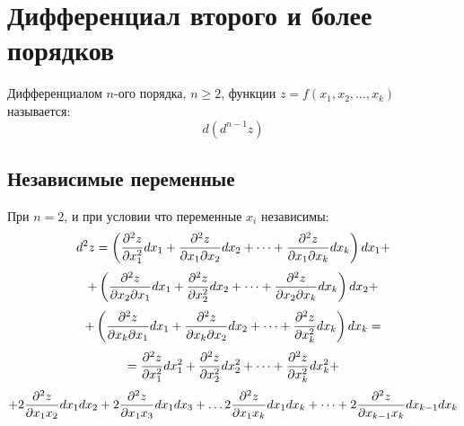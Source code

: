 \section{Дифференциал второго и более порядков}
Дифференциалом $n$-ого порядка, $n \geq 2$, функции $z=f(x_1, x_2, \dots, x_k)$ называется:
$$d(d^{n-1}z)$$
\subsection{Независимые переменные}
При $n = 2$, и при условии что переменные $x_i$ независимы:
$$d^2z = \left(
{\partial^2z \over \partial x_1^2}d x_1 +
{\partial^2z \over \partial x_1\partial x_2}d x_2 +
\dots +
{\partial^2z \over \partial x_1\partial x_k}d x_k  
\right)d x_1 + $$
$$ + \left(
{\partial^2z \over \partial x_2\partial x_1}d x_1 +
{\partial^2z \over \partial x_2^2}d x_2 +
\dots +
{\partial^2z \over \partial x_2\partial x_k}d x_k  
\right)d x_2 + $$
$$ + \left({\partial^2z \over \partial x_k\partial x_1}d x_1 +
{\partial^2z \over \partial x_k\partial x_2}d x_2 +
\dots +
{\partial^2z \over \partial x_k^2}d x_k  
\right)d x_k = $$
$$= {\partial^2z \over \partial x_1^2}d x_1^2 +
{\partial^2z \over \partial x_2^2}d x_2^2 +
\dots  +
{\partial^2z \over \partial x_k^2}d x_k^2 +  $$
$$+ 2 {\partial^2z \over \partial x_1x_2}dx_1dx_2 + 
2{\partial^2z \over \partial x_1x_3}dx_1dx_3 +
\dots
2{\partial^2z \over \partial x_1x_k}dx_1dx_k +
\dots  +
2{\partial^2z \over \partial x_{k-1}x_k}dx_{k-1}dx_k$$

